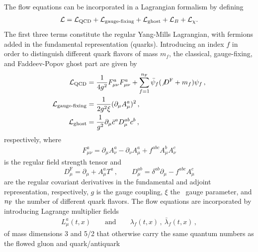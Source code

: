 The flow equations  can be incorporated in a Lagrangian
formalism by defining
\begin{align}
  \mathcal{L} = \mathcal{L}_\mathrm{{\small QCD}} +
  \mathcal{L}_\textrm{gauge-fixing} + \mathcal{L}_\mathrm{ghost} +
  \mathcal{L}_{B} + \mathcal{L}_{\chi}.
  \label{eq:Lagrangian_complete}
\end{align}
The first three terms constitute the regular Yang-Mills Lagrangian, with
fermions added in the fundamental representation (quarks). Introducing an
index $f$ in order to distinguish different quark flavors of mass $m_f$,
the classical, gauge-fixing, and Faddeev-Popov ghost part are given by
\begin{equation}
  \begin{split}
  \mathcal{L}_\mathrm{{\small QCD}} &= \frac{1}{4g^2} F_{\mu \nu}^a F_{\mu
    \nu}^a + \sum_{f=1}^{n_\mathrm{F}}\bar{\psi}_f ( \not{D}^\mathrm{F}+m_f)
  \psi_f\,,\\ \mathcal{L}_\textrm{gauge-fixing}&= \frac{1}{2 g^2 \xi}
  (\partial_\mu A_\mu^a)^2\,,\\ \mathcal{L}_\mathrm{ghost} &=
  \frac{1}{g^2}\partial_\mu \bar{c}^a D_\mu^{ab} c^b\,,
  \label{eq:lags}
  \end{split}
\end{equation}
respectively, where
\begin{equation}
  \begin{split}
    F_{\mu\nu}^a = \partial_\mu A^a_\nu - \partial_\nu A^a_\mu + f^{abc}A_\mu^bA_\nu^c
  \end{split}
\end{equation}
is the regular field strength tensor and
\begin{equation}
  D_\mu^\mathrm{F} = \partial_\mu + A_\mu^a T^a \,,\qquad D_\mu^{ab} = \delta^{ab} \partial_\mu - f^{abc} A_\mu^c
\end{equation}
are the regular covariant derivatives in the fundamental and adjoint representation, respectively, $g$
is the gauge coupling, $\xi$ the \qcd\ gauge parameter, and $n_\mathrm{F}$ the
number of different quark flavors.  The flow equations are incorporated
by introducing Lagrange multiplier fields
\begin{equation}
  \begin{split}
    L_\mu^a(t,x)\qquad\text{and}\qquad
    \lambda_f(t,x)\,,\ \bar\lambda_f(t,x)\,,
  \end{split}
\end{equation}
of mass dimensions 3 and 5/2 that otherwise carry the same quantum
numbers as the flowed gluon and quark/antiquark
